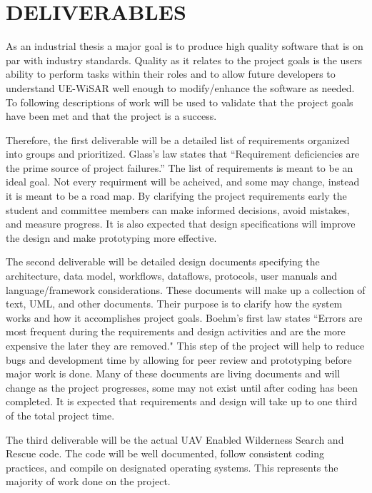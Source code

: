 \section{DELIVERABLES}
As an industrial thesis a major goal is to produce high quality software that is
on par with industry standards.  Quality as it relates to the project goals is
the users ability to perform tasks within their roles and to allow future
developers to understand UE-WiSAR well enough to modify/enhance the software as
needed.  To following descriptions of work will be used to validate that the
project goals have been met and that the project is a success.

Therefore, the first deliverable will be a detailed list of requirements
organized into groups and prioritized.  Glass's law
\cite[p.~16]{endres2003handbook} states that ``Requirement deficiencies are the
prime source of project failures.''  The list of requirements is meant to be an ideal goal.
Not every requirment will be acheived, and some may change, instead it is meant
to be a road map.  By clarifying the project requirements early the student and
committee members can make informed decisions, avoid mistakes, and measure progress.
It is also expected that design specifications will improve the design and make
prototyping more effective.  

The second deliverable will be detailed design documents specifying the
architecture, data model, workflows, dataflows, protocols, user manuals and
language/framework considerations.  These documents will make up a collection
of text, UML, and other documents.  Their purpose is to clarify how the system
works and how it accomplishes project goals.  Boehm's first law
\cite[p.~17]{endres2003handbook} states ``Errors are most frequent during the requirements and design activities and are the
more expensive the later they are removed."  This step of the project will help
to reduce bugs and development time by allowing for peer review and prototyping
before major work is done.  Many of these documents are living documents and
will change as the project progresses, some may not exist until after coding
has been completed.  It is expected that requirements and design will take up to
one third of the total project time.

The third deliverable will be the actual UAV Enabled Wilderness Search and
Rescue code.  The code will be well documented, follow consistent coding
practices, and compile on designated operating systems.  This represents the
majority of work done on the project.


